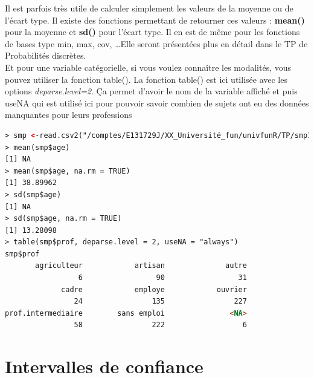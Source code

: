 Il est parfois très utile de calculer simplement les valeurs de la moyenne ou de l'écart type. Il existe des fonctions permettant de retourner ces valeurs : 
\textbf{mean()} pour la moyenne et \textbf{sd()} pour l'écart type. Il en est de même pour les fonctions de bases type min, max, cov, \dots Elle seront présentées plus en détail dans le TP de Probabilités discrètes.\newline
\\
Et pour une variable catégorielle, si vous voulez connaître les modalités, vous pouvez utiliser la fonction table(). La fonction table() est ici utilisée avec les options \textit{deparse.level=2}. Ça permet d'avoir le nom de la variable affiché et puis useNA qui est utilisé ici pour pouvoir savoir combien de sujets ont eu des données manquantes pour leurs professions
\begin{lstlisting}[language=html]
> smp <-read.csv2("/comptes/E131729J/XX_Université_fun/univfunR/TP/smp1.csv")
> mean(smp$age)
[1] NA
> mean(smp$age, na.rm = TRUE)
[1] 38.89962
> sd(smp$age)
[1] NA
> sd(smp$age, na.rm = TRUE)
[1] 13.28098
> table(smp$prof, deparse.level = 2, useNA = "always")
smp$prof
       agriculteur            artisan              autre 
                 6                 90                 31 
             cadre            employe            ouvrier 
                24                135                227 
prof.intermediaire        sans emploi               <NA> 
                58                222                  6 
\end{lstlisting}
\newpage
\section{Intervalles de confiance}
